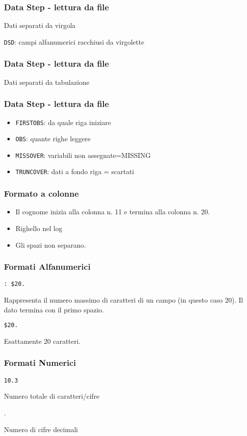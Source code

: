 \begin{frame}[fragile]\frametitle{Data Step - lettura da file }
  Dati separati da virgola

  \texttt{DSD}: campi alfanumerici racchiusi da virgolette
\end{frame}

\begin{frame}[fragile]\frametitle{Data Step - lettura da file }
  Dati separati da tabulazione
\end{frame}

\begin{frame}\frametitle{Data Step - lettura da file }
  \begin{itemize}
  \item
    \texttt{FIRSTOBS}: da quale riga iniziare
  \item
    \texttt{OBS}: quante righe leggere
  \item
    \texttt{MISSOVER}: variabili non assegnate=MISSING
  \item
    \texttt{TRUNCOVER}: dati a fondo riga = scartati
  \end{itemize}
\end{frame}

\begin{frame}[fragile]\frametitle{Formato a colonne}

  \begin{itemize}
  \item
    Il cognome inizia alla colonna n. 11 e termina alla colonna n. 20.
  \item
    Righello nel log
  \item
    Gli spazi non separano.
  \end{itemize}
\end{frame}


\begin{frame}[fragile]\frametitle{Formati Alfanumerici}
  \verb!: $20.!

  Rappresenta il numero massimo di caratteri di un campo (in questo caso
  20). Il dato termina con il primo spazio.

  \verb!$20.!

  Esattamente 20 caratteri.
\end{frame}

\begin{frame}[fragile]\frametitle{Formati Numerici}
  \verb!10.3!

  Numero totale di caratteri/cifre

  .

  Numero di cifre decimali
\end{frame}



